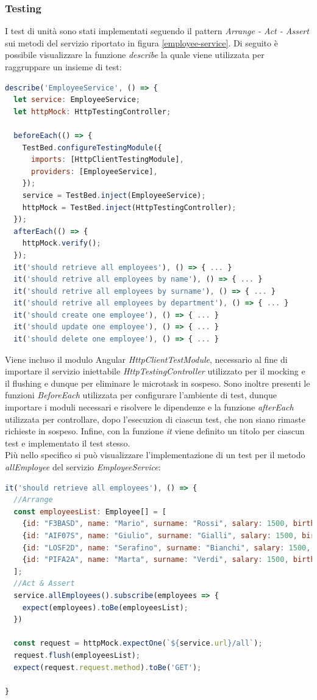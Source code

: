 \subsubsection*{Testing}
I test di unità sono stati implementati seguendo il pattern \textit{Arrange - Act - Assert} sui metodi del servizio riportato in figura \ref{employee-service}. Di seguito è possibile visualizzare la funzione \textit{describe} la quale viene utilizzata per raggruppare un insieme di test:
\begin{lstlisting}[language=JavaScript, title={employee.service.spec.test}]
describe('EmployeeService', () => {
  let service: EmployeeService;
  let httpMock: HttpTestingController;

  beforeEach(() => {
    TestBed.configureTestingModule({
      imports: [HttpClientTestingModule],
      providers: [EmployeeService],
    });
    service = TestBed.inject(EmployeeService);
    httpMock = TestBed.inject(HttpTestingController);
  });
  afterEach(() => {
    httpMock.verify();
  });
  it('should retrieve all employees'), () => { ... }
  it('should retrive all employees by name'), () => { ... }
  it('should retrive all employees by surname'), () => { ... }
  it('should retrive all employees by department'), () => { ... }
  it('should create one employee'), () => { ... }
  it('should update one employee'), () => { ... }
  it('should delete one employee'), () => { ... }
\end{lstlisting}
Viene incluso il modulo Angular \textit{HttpClientTestModule}, necessario al fine di importare il servizio iniettabile \textit{HttpTestingController} utilizzato per il mocking e il flushing e dunque per eliminare le microtask in sospeso. Sono inoltre presenti le funzioni \textit{BeforeEach} utilizzata per configurare l'ambiente di test, dunque importare i moduli necessari e risolvere le dipendenze e la funzione \textit{afterEach} utilizzata per controllare, dopo l'esecuzion di ciascun test, che non siano rimaste richieste in sospeso. Infine, con la funzione \textit{it} viene definito un titolo per ciascun test e implementato il test stesso.\\
Più nello specifico si può visualizzare l'implementazione di un test per il metodo \textit{allEmployee} del servizio \textit{EmployeeService}:
\begin{lstlisting}[language=JavaScript, title={employee.service.spec.test}]
it('should retrieve all employees'), () => {
  //Arrange
  const employeesList: Employee[] = [
    {id: "F3BASD", name: "Mario", surname: "Rossi", salary: 1500, birth: new Date("05/04/1999")},
    {id: "AIF07S", name: "Giulio", surname: "Gialli", salary: 1500, birth: new Date("02/01/1988")},
    {id: "LOSF2D", name: "Serafino", surname: "Bianchi", salary: 1500, birth: new Date("22/11/1979")},
    {id: "PIFA2A", name: "Marta", surname: "Verdi", salary: 1500, birth: new Date("30/01/1995")},
  ];
  //Act & Assert
  service.allEmployees().subscribe(employees => {
    expect(employees).toBe(employeesList);
  })

  const request = httpMock.expectOne(`${service.url}/all`);
  request.flush(employeesList);
  expect(request.request.method).toBe('GET');

}
\end{lstlisting}
